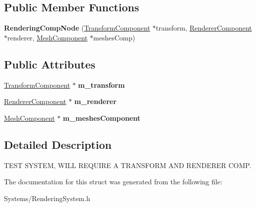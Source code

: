 \subsection*{Public Member Functions}
\begin{DoxyCompactItemize}
\item 
\mbox{\label{structRenderingCompNode_a335c5a64c9bd4324b6266a4bcb04a8a6}} 
{\bfseries Rendering\+Comp\+Node} (\hyperlink{classTransformComponent}{Transform\+Component} $\ast$transform, \hyperlink{classRendererComponent}{Renderer\+Component} $\ast$renderer, \hyperlink{classMeshComponent}{Mesh\+Component} $\ast$meshes\+Comp)
\end{DoxyCompactItemize}
\subsection*{Public Attributes}
\begin{DoxyCompactItemize}
\item 
\mbox{\label{structRenderingCompNode_a7e8df37f0579ac9a25b696ac795b94f8}} 
\hyperlink{classTransformComponent}{Transform\+Component} $\ast$ {\bfseries m\+\_\+transform}
\item 
\mbox{\label{structRenderingCompNode_a6b9b17caf2ce016e6616519490849d4c}} 
\hyperlink{classRendererComponent}{Renderer\+Component} $\ast$ {\bfseries m\+\_\+renderer}
\item 
\mbox{\label{structRenderingCompNode_aeb540226271fc2ab30caeebdf2f5853a}} 
\hyperlink{classMeshComponent}{Mesh\+Component} $\ast$ {\bfseries m\+\_\+meshes\+Component}
\end{DoxyCompactItemize}


\subsection{Detailed Description}
T\+E\+ST S\+Y\+S\+T\+EM, W\+I\+LL R\+E\+Q\+U\+I\+RE A T\+R\+A\+N\+S\+F\+O\+RM A\+ND R\+E\+N\+D\+E\+R\+ER C\+O\+MP. 

The documentation for this struct was generated from the following file\+:\begin{DoxyCompactItemize}
\item 
Systems/Rendering\+System.\+h\end{DoxyCompactItemize}
